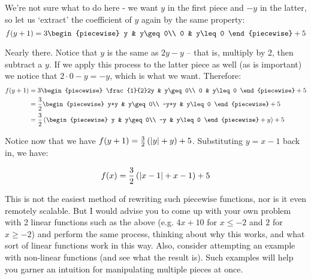 \begin{example}
    We're not sure what to do here - we want $y$ in the first piece and $-y$ in the latter, so let us `extract' the coefficient of $y$ again by the same property:
    $$
        f(y+1) = 3\begin{piecewise}
            y & y\geq 0\\
            0 & y\leq 0
        \end{piecewise}+5
    $$

    Nearly there. Notice that $y$ is the same as $2y-y$ -- that is, multiply by 2, then subtract a $y$. If we apply this process to the latter piece as well (as is important) we notice that $2\cdot 0-y=-y$, which is what we want. Therefore:
    \begin{align*}
        f(y+1) &= 3\begin{piecewise}
            \frac{1}{2}2y & y\geq 0\\
            0 & y\leq 0
        \end{piecewise}+5\\
        &= \frac{3}{2}\begin{piecewise}
            y+y & y\geq 0\\
            -y+y & y\leq 0
        \end{piecewise}+5 \\
        &= \frac{3}{2}\left(\begin{piecewise}
            y & y\geq 0\\
            -y & y\leq 0
        \end{piecewise}+y\right)+5
    \end{align*}

    Notice now that we have $f(y+1)=\frac{3}{2}\left(\abs{y}+y\right)+5$. Substituting $y=x-1$ back in, we have:

    $$
        f(x)=\frac{3}{2}\left(\abs{x-1}+x-1\right)+5
    $$

    This is not the easiest method of rewriting such piecewise functions, nor is it even remotely scalable. But I would advise you to come up with your own problem with 2 linear functions such as the above (e.g. $4x+10$ for $x\leq -2$ and $2$ for $x\geq -2$) and perform the same process, thinking about why this works, and what sort of linear functions work in this way. Also, consider attempting an example with non-linear functions (and see what the result is). Such examples will help you garner an intuition for manipulating multiple pieces at once.
\end{example}

